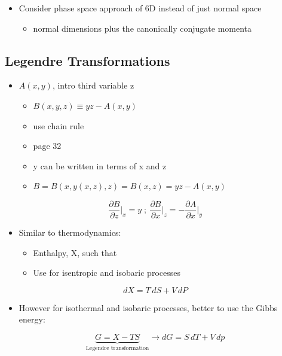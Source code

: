 \documentclass[a4paper,11pt,normalem]{article}
\begin{document}
\begin{itemize}
\item
  Consider phase space approach of 6D instead of just normal space
  \begin{itemize}
  \item
    normal dimensions plus the canonically conjugate momenta
  \end{itemize}
\end{itemize}

\subsection{Legendre Transformations}\label{legendre-transformations}

\begin{itemize}
\item
  \(A(x,y)\), intro third variable z
  \begin{itemize}
  \item
    \(B(x,y,z) \equiv yz - A(x,y)\)
  \item
    use chain rule
  \item
    page 32
  \item
    y can be written in terms of x and z
  \item
    \(B = B(x,y(x,z),z) = B(x,z) = yz - A(x,y)\)
  \end{itemize}
\end{itemize}

\[
    \frac{\partial B}{\partial z}\Bigg|_x = y_{} ~;~ \frac{\partial B}{\partial x}\Bigg|_z = -\frac{\partial A}{\partial x}\Bigg|_{y}
\]

\begin{itemize}
\item
  Similar to thermodynamics:
  \begin{itemize}
  \item
    Enthalpy, X, such that
  \item
    Use for isentropic and isobaric processes
  \end{itemize}
\end{itemize}

\[
    dX = T\,dS + V\,dP
\]

\begin{itemize}
\item
  However for isothermal and isobaric processes, better to use the Gibbs
  energy:
\end{itemize}

\[
    \underbrace{G = X - TS}_{\text{Legendre transformation}} \to dG = S\,dT + V\,dp
\]
\end{document}
